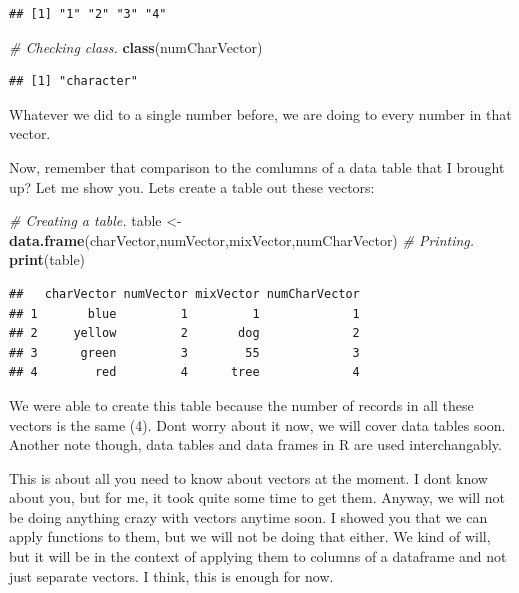 \documentclass[]{book}
\newenvironment{Shaded}{\begin{snugshade}}{\end{snugshade}}
\newcommand{\CommentTok}[1]{\textcolor[rgb]{0.56,0.35,0.01}{\textit{#1}}}
\newcommand{\KeywordTok}[1]{\textcolor[rgb]{0.13,0.29,0.53}{\textbf{#1}}}
\newcommand{\NormalTok}[1]{#1}
\newcommand{\StringTok}[1]{\textcolor[rgb]{0.31,0.60,0.02}{#1}}
\begin{document}
\begin{verbatim}
## [1] "1" "2" "3" "4"
\end{verbatim}

\begin{Shaded}
\begin{Highlighting}[]
\CommentTok{# Checking class.}
\KeywordTok{class}\NormalTok{(numCharVector)}
\end{Highlighting}
\end{Shaded}

\begin{verbatim}
## [1] "character"
\end{verbatim}

Whatever we did to a single number before, we are doing to every number in that vector.

Now, remember that comparison to the comlumns of a data table that I brought up? Let me show you. Lets create a table out these vectors:

\begin{Shaded}
\begin{Highlighting}[]
\CommentTok{# Creating a table.}
\NormalTok{table <-}\StringTok{ }\KeywordTok{data.frame}\NormalTok{(charVector,numVector,mixVector,numCharVector)}
\CommentTok{# Printing.}
\KeywordTok{print}\NormalTok{(table)}
\end{Highlighting}
\end{Shaded}

\begin{verbatim}
##   charVector numVector mixVector numCharVector
## 1       blue         1         1             1
## 2     yellow         2       dog             2
## 3      green         3        55             3
## 4        red         4      tree             4
\end{verbatim}

We were able to create this table because the number of records in all these vectors is the same (4). Dont worry about it now, we will cover data tables soon. Another note though, data tables and data frames in R are used interchangably.

This is about all you need to know about vectors at the moment. I dont know about you, but for me, it took quite some time to get them. Anyway, we will not be doing anything crazy with vectors anytime soon. I showed you that we can apply functions to them, but we will not be doing that either. We kind of will, but it will be in the context of applying them to columns of a dataframe and not just separate vectors. I think, this is enough for now.
\end{document}
